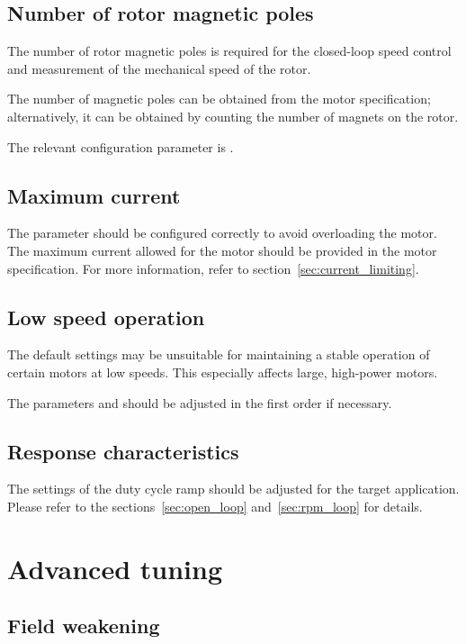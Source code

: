 \documentclass{zubaxdoc}
\begin{document}
\subsection{Number of rotor magnetic poles}

The number of rotor magnetic poles is required for the closed-loop speed control and
measurement of the mechanical speed of the rotor.

The number of magnetic poles can be obtained from the motor specification;
alternatively, it can be obtained by counting the number of magnets on the rotor.

The relevant configuration parameter is .

\subsection{Maximum current}

The parameter  should be configured correctly to avoid overloading the motor.
The maximum current allowed for the motor should be provided in the motor specification.
For more information, refer to section~\ref{sec:current_limiting}.

\subsection{Low speed operation}

The default settings may be unsuitable for maintaining a stable operation of certain motors at low speeds.
This especially affects large, high-power motors.

The parameters  and  should be adjusted in the first
order if necessary.

\subsection{Response characteristics}

The settings of the duty cycle ramp should be adjusted for the target application.
Please refer to the sections~\ref{sec:open_loop} and~\ref{sec:rpm_loop} for details.

\section{Advanced tuning}

\subsection{Field weakening}
\end{document}
